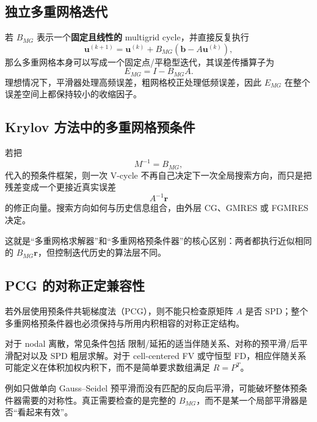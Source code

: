 \subsection{独立多重网格迭代}

若 $B_{MG}$ 表示一个\textbf{固定且线性的} multigrid cycle，并直接反复执行
\begin{equation}
\bm u^{(k+1)}
=
\bm u^{(k)}
+
B_{MG}
\left(
\bm b-A\bm u^{(k)}
\right),
\label{eq:preconditioner-mg-stationary-iteration}
\end{equation}
那么多重网格本身可以写成一个固定点/平稳型迭代，其误差传播算子为
\begin{equation}
E_{MG}
=
I-B_{MG}A.
\end{equation}
理想情况下，平滑器处理高频误差，粗网格校正处理低频误差，因此 $E_{MG}$ 在整个误差空间上都保持较小的收缩因子。

\subsection{Krylov 方法中的多重网格预条件}

若把
\begin{equation}
M^{-1}=B_{MG},
\end{equation}
代入的预条件框架，则一次 V-cycle 不再自己决定下一次全局搜索方向，而只是把残差变成一个更接近真实误差
\begin{equation}
A^{-1}\bm r
\end{equation}
的修正向量。搜索方向如何与历史信息组合，由外层 CG、GMRES 或 FGMRES 决定。

这就是“多重网格求解器”和“多重网格预条件器”的核心区别：两者都执行近似相同的 $B_{MG}\bm r$，但控制迭代历史的算法层不同。

\subsection{PCG 的对称正定兼容性}

若外层使用预条件共轭梯度法（PCG），则不能只检查原矩阵 $A$ 是否 SPD；整个多重网格预条件器也必须保持与所用内积相容的对称正定结构。

对于 nodal 离散，常见条件包括 限制/延拓的适当伴随关系、对称的预平滑/后平滑配对以及 SPD 粗层求解。对于 cell-centered FV 或守恒型 FD，相应伴随关系可能定义在体积加权内积下，而不是简单要求数组满足 $R=P^T$。

例如只做单向 Gauss--Seidel 预平滑而没有匹配的反向后平滑，可能破坏整体预条件器需要的对称性。真正需要检查的是完整的 $B_{MG}$，而不是某一个局部平滑器是否“看起来有效”。

